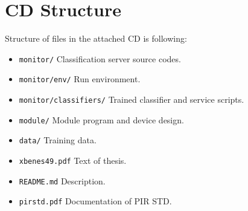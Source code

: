 




\chapter{CD Structure}
Structure of files in the attached CD is following:
\begin{itemize}
\item \texttt{monitor/} Classification server source codes.
\item \texttt{monitor/env/} Run environment.
\item \texttt{monitor/classifiers/} Trained classifier and service scripts.
\item \texttt{module/} Module program and device design.
\item \texttt{data/} Training data.
\item \texttt{xbenes49.pdf} Text of thesis.
\item \texttt{README.md} Description.
\item \texttt{pirstd.pdf} Documentation of PIR STD.
\end{itemize}





